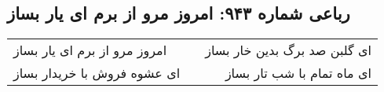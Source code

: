 \begin{center}
\section*{رباعی شماره ۹۴۳: امروز مرو از برم ای یار بساز}
\label{sec:0943}
\begin{longtable}{l p{0.5cm} r}
امروز مرو از برم ای یار بساز
&&
ای گلبن صد برگ بدین خار بساز
\\
ای عشوه فروش با خریدار بساز
&&
ای ماه تمام با شب تار بساز
\\
\end{longtable}
\end{center}

